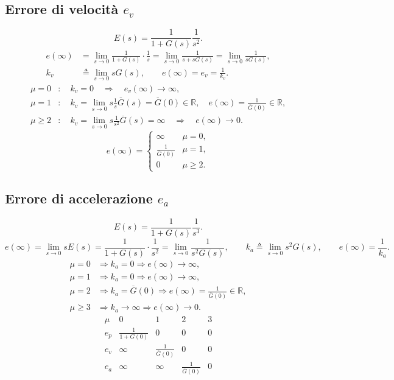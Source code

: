 \subsection*{Errore di velocità $e_v$}
\[
E(s)=\frac1{1+G(s)}\frac1{s^2}.
\]
\begin{align*}
e(\infty)&=\lim_{s\to0}\frac1{1+G(s)}\cdot\frac1s
=\lim_{s\to0}\frac1{s+sG(s)}
=\lim_{s\to0}\frac1{sG(s)},\\
k_v&\mathrel{\triangleq}\lim_{s\to0}sG(s),\qquad
 e(\infty)=e_v=\frac1{k_v}.
\end{align*}
\begin{align*}
\mu=0&:\quad k_v=0\quad\Longrightarrow\quad e_v(\infty)\to\infty,\\
\mu=1&:\quad k_v=\lim_{s\to0}s\frac1s\overline G(s)=\overline G(0)\in\mathbb R,
\quad e(\infty)=\frac1{\overline G(0)}\in\mathbb R,\\
\mu\geq2&:\quad k_v=\lim_{s\to0}s\frac1{s^2}\overline G(s)=\infty
\quad\Longrightarrow\quad e(\infty)\to0.
\end{align*}
\[
e(\infty)=\begin{cases}\infty&\mu=0,\\\frac1{\overline G(0)}&\mu=1,\\0&\mu\geq2.\end{cases}
\]
\subsection*{Errore di accelerazione $e_a$}
\[
E(s)=\frac1{1+G(s)}\frac1{s^3}.
\]
\[
e(\infty)=\lim_{s\to0}sE(s)
=\frac1{1+G(s)}\cdot\frac1{s^2}
=\lim_{s\to0}\frac1{s^2G(s)},
\qquad k_a\mathrel{\triangleq}\lim_{s\to0}s^2G(s),\qquad e(\infty)=\frac1{k_a}.
\]
\begin{align*}
\mu=0&\Longrightarrow k_a=0\Longrightarrow e(\infty)\to\infty,\\
\mu=1&\Longrightarrow k_a=0\Longrightarrow e(\infty)\to\infty,\\
\mu=2&\Longrightarrow k_a=\overline G(0)\Longrightarrow
 e(\infty)=\frac1{\overline G(0)}\in\mathbb R,\\
\mu\geq3&\Longrightarrow k_a\to\infty\Longrightarrow e(\infty)\to0.
\end{align*}
\[
\begin{array}{c|cccc}\mu&0&1&2&3\\\hline
 e_p&\frac1{1+G(0)}&0&0&0\\
 e_v&\infty&\frac1{\overline G(0)}&0&0\\
 e_a&\infty&\infty&\frac1{\overline G(0)}&0
\end{array}
\]
